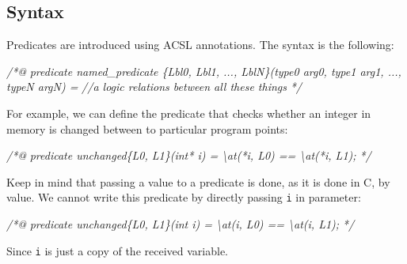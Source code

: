 \documentclass[12pt,francais,]{scrbook}
\newenvironment{Shaded}{}{}
\newcommand{\CommentTok}[1]{\textcolor[rgb]{0.38,0.63,0.69}{\textit{{#1}}}}
\newcommand{\CommentTokAlt}[1]{\textcolor[rgb]{0.18,0.33,0.39}{\textit{{#1}}}}
\newenvironment{zdsalertblock}[1]{%
  \tcolorbox[beamer,%
    noparskip,breakable,
    colback=LightCoral,colframe=DarkRed,%
    colbacklower=Tomato,%
    title=#1]
}{\endtcolorbox}
\begin{document}
\subsection{Syntax}\label{syntax}

Predicates are introduced using ACSL annotations. The syntax is the
following:

\begin{footnotesize}\begin{Shaded}
\begin{Highlighting}[]
\CommentTok{/*@}
\CommentTok{  predicate named_predicate \{Lbl0, Lbl1, ..., LblN\}(type0 arg0, type1 arg1, ..., typeN argN) =}
\CommentTok{    //a logic relations between all these things}
\CommentTok{*/}
\end{Highlighting}
\end{Shaded}\end{footnotesize}

For example, we can define the predicate that checks whether an integer
in memory is changed between to particular program points:

\begin{footnotesize}\begin{Shaded}
\begin{Highlighting}[]
\CommentTok{/*@}
\CommentTok{  predicate unchanged\{L0, L1\}(int* i) =}
\CommentTok{    \textbackslash{}at(*i, L0) == \textbackslash{}at(*i, L1);}
\CommentTok{*/}
\end{Highlighting}
\end{Shaded}\end{footnotesize}

\begin{zdsalertblock}{Warning}
  Keep in mind that passing a value to a predicate is done, as it is done in C,
  by value. We cannot write this predicate by directly passing \texttt{i} in
  parameter:
  \begin{footnotesize}\begin{Shaded}
      \begin{Highlighting}[]
\CommentTokAlt{/*@}
\CommentTokAlt{  predicate unchanged\{L0, L1\}(int i) =}
\CommentTokAlt{    \textbackslash{}at(i, L0) == \textbackslash{}at(i, L1);}
\CommentTokAlt{*/}
      \end{Highlighting}
  \end{Shaded}\end{footnotesize}
  Since \texttt{i} is just a copy of the received variable.
\end{zdsalertblock}
  
\end{document}
